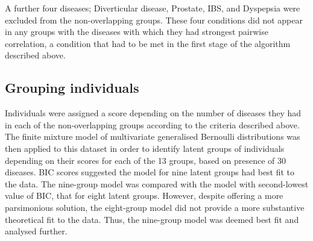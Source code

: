 \documentclass[12pt,]{report}
\begin{document}
A further four diseases; Diverticular disease, Prostate, IBS, and
Dyspepsia were excluded from the non-overlapping groups. These four
conditions did not appear in any groups with the diseases with which
they had strongest pairwise correlation, a condition that had to be met
in the first stage of the algorithm described above.

\begin{table}[]
  \centering
  \caption{Non-overlapping groups of diseases derived from Ng algorithm}
  \label{tab:no-overlap}
\end{table}

\subsection{Grouping individuals}\label{subsec:clust-clustering}

Individuals were assigned a score depending on the number of diseases
they had in each of the non-overlapping groups according to the criteria
described above. The finite mixture model of multivariate generalised
Bernoulli distributions was then applied to this dataset in order to
identify latent groups of individuals depending on their scores for each
of the 13 groups, based on presence of 30 diseases. BIC scores suggested
the model for nine latent groups had best fit to the data. The
nine-group model was compared with the model with second-lowest value of
BIC, that for eight latent groups. However, despite offering a more
parsimonious solution, the eight-group model did not provide a more
substantive theoretical fit to the data. Thus, the nine-group model was
deemed best fit and analysed further.
\end{document}
